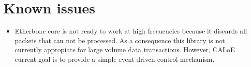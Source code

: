 \section{Known issues}

\begin{itemize}
 \item {Etherbone core is not ready to work at high frecuencies because it discards all packets that can not be processed.
 As a consequence this library is not currently appropiate for large volume data transactions. However, CALoE current goal is to provide a simple event-driven control mechanism.}
\end{itemize}
